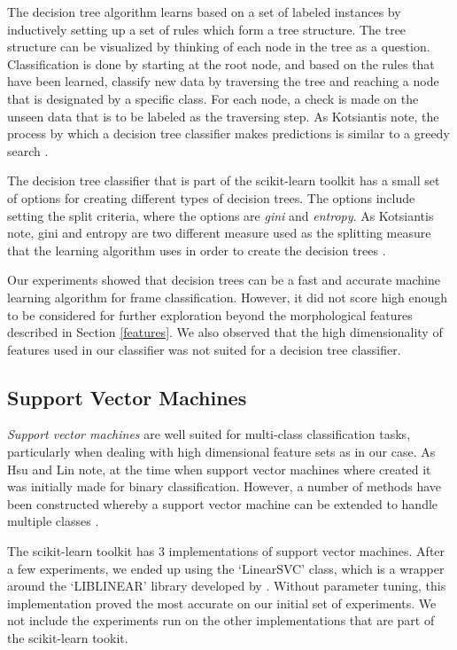 The decision tree algorithm learns based on a set of labeled instances by inductively setting up a set of rules which form a tree structure. The tree structure can be visualized by thinking of each node in the tree as a question. Classification is done by starting at the root node, and based on the rules that have been learned, classify new data by traversing the tree and reaching a node that is designated by a specific class. For each node, a check is made on the unseen data that is to be labeled as the traversing step. As Kotsiantis note, the process by which a decision tree classifier makes predictions is similar to a greedy search \cite{Kotsiantis:13}.

The decision tree classifier that is part of the scikit-learn toolkit has a small set of options for creating different types of decision trees. The options include setting the split criteria, where the options are \textit{gini} and \textit{entropy}. As Kotsiantis note, gini and entropy are two different measure used as the splitting measure that the learning algorithm uses in order to create the decision trees \cite{Kotsiantis:13}.

Our experiments showed that decision trees can be a fast and accurate machine learning algorithm for frame classification. However, it did not score high enough to be considered for further exploration beyond the morphological features described in Section \ref{features}. We also observed that the high dimensionality of features used in our classifier was not suited for a decision tree classifier.

\subsection{Support Vector Machines}

\textit{Support vector machines} are well suited for multi-class classification tasks, particularly when dealing with high dimensional feature sets as in our case. As Hsu and Lin note, at the time when support vector machines where created it was initially made for binary classification. However, a number of methods have been constructed whereby a support vector machine can be extended to handle multiple classes \cite{Hsu:02}.

The scikit-learn toolkit has 3 implementations of support vector machines. After a few experiments, we ended up using the `LinearSVC' class, which is a wrapper around the `LIBLINEAR' library developed by  . Without parameter tuning, this implementation proved the most accurate on our initial set of experiments. We not include the experiments run on the other implementations that are part of the scikit-learn tookit.

